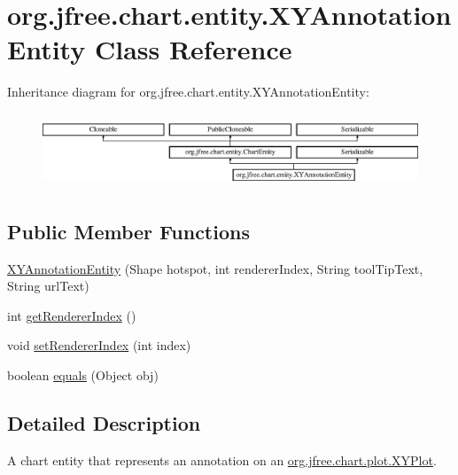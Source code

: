 \hypertarget{classorg_1_1jfree_1_1chart_1_1entity_1_1_x_y_annotation_entity}{}\section{org.\+jfree.\+chart.\+entity.\+X\+Y\+Annotation\+Entity Class Reference}
\label{classorg_1_1jfree_1_1chart_1_1entity_1_1_x_y_annotation_entity}
Inheritance diagram for org.\+jfree.\+chart.\+entity.\+X\+Y\+Annotation\+Entity\+:\begin{figure}[H]
\begin{center}
\leavevmode
\includegraphics[height=2.248996cm]{classorg_1_1jfree_1_1chart_1_1entity_1_1_x_y_annotation_entity}
\end{center}
\end{figure}
\subsection*{Public Member Functions}
\begin{DoxyCompactItemize}
\item 
\mbox{\hyperlink{classorg_1_1jfree_1_1chart_1_1entity_1_1_x_y_annotation_entity_a4c0cdca2a3aa809af8e37ed95da066d7}{X\+Y\+Annotation\+Entity}} (Shape hotspot, int renderer\+Index, String tool\+Tip\+Text, String url\+Text)
\item 
int \mbox{\hyperlink{classorg_1_1jfree_1_1chart_1_1entity_1_1_x_y_annotation_entity_a12dabd65e124757993aaca196f3f931f}{get\+Renderer\+Index}} ()
\item 
void \mbox{\hyperlink{classorg_1_1jfree_1_1chart_1_1entity_1_1_x_y_annotation_entity_a4785a31a2cec0bff6735e43d7df255b5}{set\+Renderer\+Index}} (int index)
\item 
boolean \mbox{\hyperlink{classorg_1_1jfree_1_1chart_1_1entity_1_1_x_y_annotation_entity_a1acb66102eebf9c0f32024964df1b2b8}{equals}} (Object obj)
\end{DoxyCompactItemize}


\subsection{Detailed Description}
A chart entity that represents an annotation on an \mbox{\hyperlink{classorg_1_1jfree_1_1chart_1_1plot_1_1_x_y_plot}{org.\+jfree.\+chart.\+plot.\+X\+Y\+Plot}}. 

